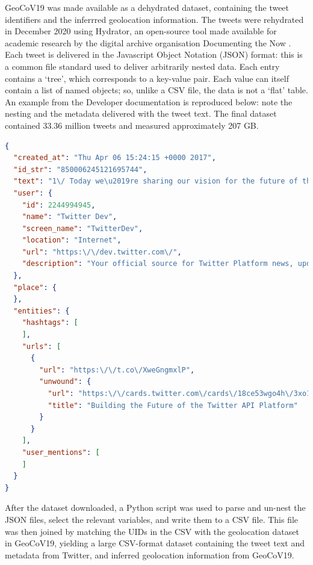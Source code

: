 \documentclass[12pt,a4]{article}
\begin{document}
GeoCoV19 was made available as a dehydrated dataset, containing the tweet identifiers and the inferrred geolocation information. The tweets were rehydrated in December 2020 using Hydrator, an open-source tool made available for academic research by the digital archive organisation Documenting the Now \parencite{summersHydrator2020}. Each tweet is delivered in the Javascript Object Notation (JSON) format: this is a common file standard used to deliver arbitrarily nested data. Each entry contains a `tree', which corresponds to a key-value pair. Each value can itself contain a list of named objects; so, unlike a CSV file, the data is not a `flat' table. An example from the Developer documentation is reproduced below: note the nesting and the metadata delivered with the tweet text. The final dataset contained 33.36 million tweets and measured approximately 207 GB.
\begin{singlespace}
\begin{lstlisting}[language=json,numbers=none,caption=Example Tweet object JSON file \parencite{twitterinc.DataDictionaryStandard2021}]
{
  "created_at": "Thu Apr 06 15:24:15 +0000 2017",
  "id_str": "850006245121695744",
  "text": "1\/ Today we\u2019re sharing our vision for the future of the Twitter API platform!\nhttps:\/\/t.co\/XweGngmxlP",
  "user": {
    "id": 2244994945,
    "name": "Twitter Dev",
    "screen_name": "TwitterDev",
    "location": "Internet",
    "url": "https:\/\/dev.twitter.com\/",
    "description": "Your official source for Twitter Platform news, updates & events. Need technical help? Visit https:\/\/twittercommunity.com\/ \u2328\ufe0f #TapIntoTwitter"
  },
  "place": {   
  },
  "entities": {
    "hashtags": [      
    ],
    "urls": [
      {
        "url": "https:\/\/t.co\/XweGngmxlP",
        "unwound": {
          "url": "https:\/\/cards.twitter.com\/cards\/18ce53wgo4h\/3xo1c",
          "title": "Building the Future of the Twitter API Platform"
        }
      }
    ],
    "user_mentions": [     
    ]
  }
}
\end{lstlisting}
\end{singlespace}
After the dataset downloaded, a Python script was used to parse and un-nest the JSON files, select the relevant variables, and write them to a CSV file. This file was then joined by matching the UIDs in the CSV with the geolocation dataset in GeoCoV19, yielding a large CSV-format dataset containing the tweet text and metadata from Twitter, and inferred geolocation information from GeoCoV19.
\end{document}
